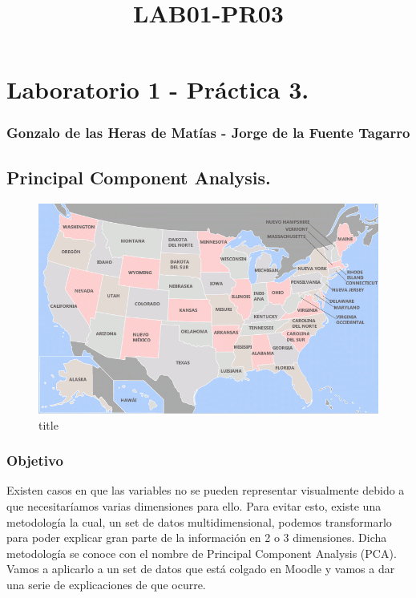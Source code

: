 \documentclass[11pt]{article}
\title{LAB01-PR03}
\makeatletter
\def\maxwidth{\ifdim\Gin@nat@width>\linewidth\linewidth
    \else\Gin@nat@width\fi}
\let\Oldincludegraphics\includegraphics
\renewcommand{\includegraphics}[1]{\Oldincludegraphics[width=.8\maxwidth]{#1}}
\makeatother
\begin{document}
    
    
    \maketitle
    
    

    
    \section{Laboratorio 1 - Práctica
3.}\label{laboratorio-1---pruxe1ctica-3.}

\subsubsection{Gonzalo de las Heras de Matías - Jorge de la Fuente
Tagarro}\label{gonzalo-de-las-heras-de-matuxedas---jorge-de-la-fuente-tagarro}

\subsection{Principal Component
Analysis.}\label{principal-component-analysis.}

\begin{figure}
\centering
\includegraphics{Images/usa.gif}
\caption{title}
\end{figure}

\subsubsection{Objetivo}\label{objetivo}

Existen casos en que las variables no se pueden representar visualmente
debido a que necesitaríamos varias dimensiones para ello. Para evitar
esto, existe una metodología la cual, un set de datos multidimensional,
podemos transformarlo para poder explicar gran parte de la información
en 2 o 3 dimensiones. Dicha metodología se conoce con el nombre de
Principal Component Analysis (PCA). Vamos a aplicarlo a un set de datos
que está colgado en Moodle y vamos a dar una serie de explicaciones de
que ocurre.
\end{document}
